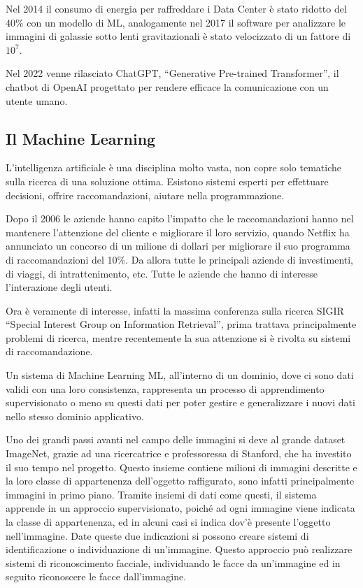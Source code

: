 \documentclass{article}
\numberwithin{equation}{subsection}
\begin{document}
Nel 2014 il consumo di energia per raffreddare i Data Center è stato ridotto del 40\% con un modello 
di ML, analogamente nel 2017 il software per analizzare le immagini di galassie sotto lenti 
gravitazionali è stato velocizzato di un fattore di $10^7$.  

Nel 2022 venne rilasciato ChatGPT, ``Generative Pre-trained Transformer'', il chatbot di OpenAI 
progettato per rendere efficace la comunicazione con un utente umano. 

\subsection{Il Machine Learning}

L'intelligenza artificiale è una disciplina molto vasta, non copre solo tematiche sulla ricerca di una 
soluzione ottima. Esistono sistemi esperti per effettuare decisioni, offrire raccomandazioni, aiutare nella 
programmazione. 

Dopo il 2006 le aziende hanno capito l'impatto che le raccomandazioni hanno nel mantenere l'attenzione del 
cliente e migliorare il loro servizio, quando Netflix ha annunciato un concorso di un milione di dollari 
per migliorare il suo programma di raccomandazioni del 10\%. Da allora tutte le principali aziende di 
investimenti, di viaggi, di intrattenimento, etc. Tutte le aziende che hanno di interesse l'interazione 
degli utenti. 

Ora è veramente di interesse, infatti la massima conferenza sulla ricerca SIGIR
``Special Interest Group on Information Retrieval'', prima trattava principalmente problemi di ricerca, 
mentre recentemente la sua attenzione si è rivolta su sistemi di raccomandazione. 

Un sistema di Machine Learning ML, all'interno di un dominio, dove ci sono dati validi con una loro 
consistenza, rappresenta un processo di apprendimento supervisionato o meno su questi dati per 
poter gestire e generalizzare i nuovi dati nello stesso dominio applicativo. 

Uno dei grandi passi avanti nel campo delle immagini si deve al grande dataset ImageNet, grazie ad una 
ricercatrice e professoressa di Stanford, che ha investito il suo tempo nel progetto. Questo insieme contiene 
milioni di immagini descritte e la loro classe di appartenenza dell'oggetto raffigurato, sono infatti 
principalmente immagini in primo piano. Tramite insiemi di dati come questi, il sistema apprende in un 
approccio supervisionato, poiché ad ogni immagine viene indicata la classe di appartenenza, ed in alcuni casi 
si indica dov'è presente l'oggetto nell'immagine. Date queste due indicazioni si possono creare sistemi di 
identificazione o individuazione di un'immagine. 
Questo approccio può realizzare sistemi di riconoscimento facciale, individuando le facce da un'immagine ed in 
seguito riconoscere le facce dall'immagine. 
\end{document}

